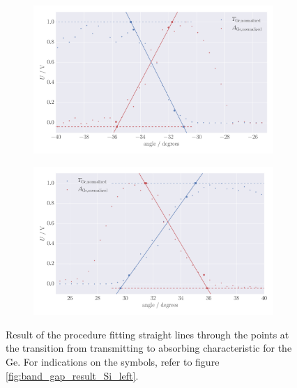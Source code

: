 \begin{figure}
    \centering
    \begin{subfigure}[b]{\pltw}
        \includegraphics[width=1.0\linewidth]{figures/band_gap_result_Ge_left}
        \caption{}
        \label{fig:band_gap_result_Ge_left}
    \end{subfigure}
    \begin{subfigure}[b]{\pltw}
        \includegraphics[width=1.0\linewidth]{figures/band_gap_result_Ge_right}
        \caption{}
        \label{fig:band_gap_result_Ge_right}
    \end{subfigure}
    \caption{
        Result of the procedure fitting straight lines through the points 
        at the transition from transmitting to absorbing characteristic
        for the Ge.
        For indications on the symbols, refer to figure 
        \ref{fig:band_gap_result_Si_left}. 
        }
    \label{fig:band_gap_result_Ge}
\end{figure}


